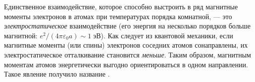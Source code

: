 Единственное взаимодействие, которое способно выстроить в ряд магнитные
моменты электронов в атомах при температурах порядка комнатной, --- это
\emph{электростатическое} взаимодействие
(его энергия на несколько порядков больше магнитной:
$e^2/(4\pi\varepsilon_0 a) \sim 1\;эВ$).
Как следует из квантовой механики, если магнитные моменты (или спины) электронов
соседних атомов сонаправлены,
их электростатическое отталкивание становится \emph{меньше}.
Таким образом, магнитным моментам атомов энергетически выгодно ориентироваться
в одном направлении. Такое явление получило название
.

%



